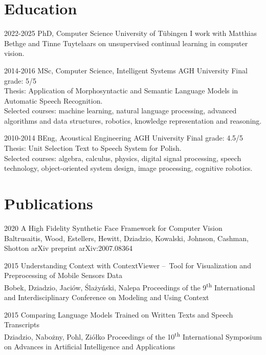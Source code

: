 \documentclass[]{friggeri-cv_osx}
\begin{document}
\section{Education}
\begin{entrylist}

\entry
{2022-2025}
{PhD, Computer Science}
{University of Tübingen}
{I work with Matthias Bethge and Tinne Tuytelaars on unsupervised continual learning in computer vision.\\}

\entry
{2014-2016}
{MSc, Computer Science, Intelligent Systems}
{AGH University}
{Final grade: 5/5\\
Thesis: Application of Morphosyntactic and Semantic Language Models in Automatic Speech Recognition.\\
Selected courses: machine learning, natural language processing, advanced algorithms and data structures, robotics, knowledge representation and reasoning.\\}

\entry
{2010-2014}
{BEng, Acoustical Engineering}
{AGH University}
{Final grade: 4.5/5\\
Thesis: Unit Selection Text to Speech System for Polish.\\
Selected courses: algebra, calculus, physics, digital signal processing, speech technology, object-oriented system design, image processing, cognitive robotics.}
\end{entrylist}


\newpage
\section{Publications}
\begin{entrylist}
\entry
{2020}
{A High Fidelity Synthetic Face Framework for Computer Vision\\}
{Baltrusaitis, Wood, Estellers, Hewitt, Dziadzio, Kowalski, Johnson, Cashman, Shotton}
{arXiv preprint arXiv:2007.08364\\}

\entry
{2015}
{Understanding Context with ContextViewer – Tool for Visualization and Preprocessing of Mobile Sensors Data\\}
{Bobek, Dziadzio, Jaciów, Ślażyński, Nalepa}
{Proceedings of the 9\textsuperscript{th} International and Interdisciplinary Conference on Modeling and Using Context\\}

\entry
{2015}
{Comparing Language Models Trained on Written Texts and Speech Transcripts\\}
{Dziadzio, Nabożny, Pohl, Ziółko}
{Proceedings of the 10\textsuperscript{th} International Symposium on Advances in Artificial Intelligence and Applications\\}
\end{entrylist}
\end{document}
